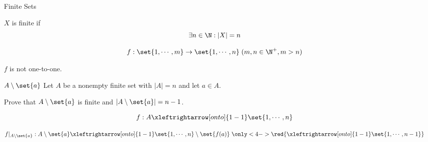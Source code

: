 
\begin{frame}{}
  \begin{center}
    {\LARGE Finite Sets}
  \end{center}


  \pause
  \begin{quote}
    \begin{center}
      {\large {}}
    \end{center}
  \end{quote}
\end{frame}


\begin{frame}{}
  \begin{definition}[Finite]
    $X$ is finite if
    \[
      \exists n \in \N: |X| = n
    \]
  \end{definition}

  \pause
  \vspace{0.60cm}
  \begin{theorem}
    \[
      f: \set{1, \cdots, m} \to \set{1, \cdots, n} \; (m,n \in \N^{+}, m > n)
    \]

    $f$ is not one-to-one.
  \end{theorem}
\end{frame}

\begin{frame}{}
  \begin{exampleblock}{$A \setminus \set{a}$}
    Let $A$ be a nonempty finite set with $|A| = n$ and let $a \in A$.

    Prove that $A \setminus \set{a}$ is finite and $|A \setminus \set{a}| = n - 1$.
  \end{exampleblock}

  \pause
  \[
    f: A \xleftrightarrow[onto]{1-1} \set{1, \cdots, n}
  \]

  \pause
  \[
    f|_{A \setminus \set{a}}: A \setminus \set{a} \xleftrightarrow[onto]{1-1} \set{1, \cdots, n} \setminus \set{f(a)} \;
    \only<4->{\red{\xleftrightarrow[onto]{1-1} \set{1, \cdots, n - 1}}}
  \]
\end{frame}

